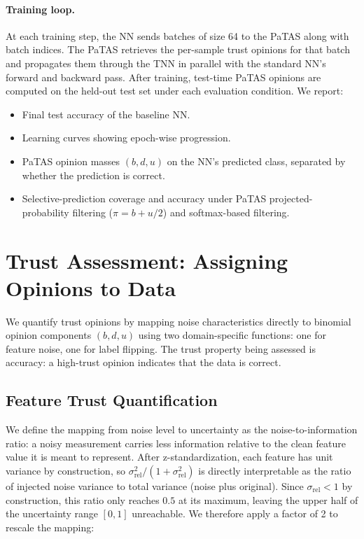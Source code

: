 \paragraph{Training loop.} 
At each training step, the \ac{NN} sends batches of size 64 to the \ac{PaTAS} along with batch indices. The \ac{PaTAS}  retrieves the per-sample trust opinions for that batch and propagates them through the \acf{TNN} in parallel with the standard \ac{NN}'s forward and backward pass. After training, test-time \ac{PaTAS} opinions are computed on the held-out test set under each evaluation condition. We report:
\begin{itemize}
    \item Final test accuracy of the baseline \ac{NN}.
    \item Learning curves showing epoch-wise progression.
    \item \ac{PaTAS} opinion masses $(b, d, u)$ on the \ac{NN}'s predicted class, separated by whether the prediction is correct.
    \item Selective-prediction coverage and accuracy under \ac{PaTAS} projected-probability filtering ($\pi = b + u/2$) and softmax-based filtering.
\end{itemize}


\section{Trust Assessment: Assigning Opinions to Data}
\label{sec:trust_quantification}


We quantify trust opinions by mapping noise characteristics directly to binomial opinion components $(b, d, u)$ using two domain-specific functions: one for feature noise, one for label flipping. The trust property being assessed is accuracy: a high-trust opinion indicates that the data is correct. 

\subsection{Feature Trust Quantification}
\label{sec:feature_trust_quantification}

We define the mapping from noise level to uncertainty as the noise-to-information ratio: a noisy measurement carries less information relative to the clean feature value it is meant to represent. After z-standardization, each feature has unit variance by construction, so $\sigma_{\text{rel}}^2 / (1 + \sigma_{\text{rel}}^2)$ is directly interpretable as the ratio of injected noise variance to total variance (noise plus original). Since $\sigma_{\text{rel}} < 1$ by construction, this ratio only reaches $0.5$ at its maximum, leaving the upper half of the uncertainty range $[0, 1]$ unreachable. We therefore apply a factor of 2 to rescale the mapping:

